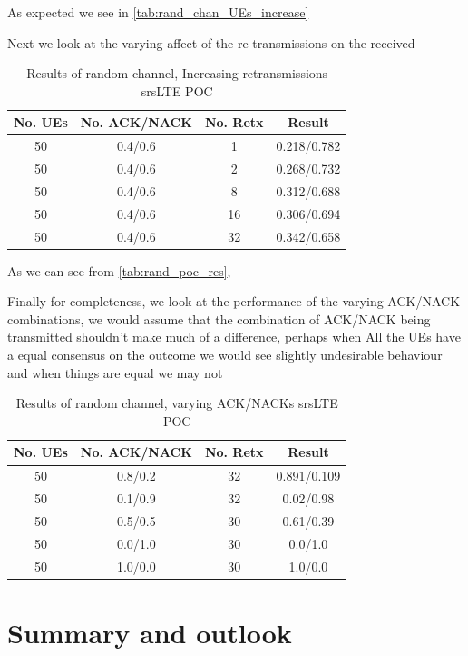 \documentclass{article}
\begin{document}
As expected we see in \cref{tab:rand_chan_UEs_increase}


Next we look at the varying affect of the re-transmissions on the received 

\begin{table}[H]
    \centering
 \begin{tabular}{||c c c c||} 
 \hline
 No. UEs & No. ACK/NACK & No. Retx & Result \\ [0.5ex] 
 \hline\hline
 50 &  0.4/0.6 & 1 &  0.218/0.782  \\ 
 \hline
 50 &  0.4/0.6 & 2 & 0.268/0.732 \\
 \hline
 50 &  0.4/0.6 & 8 & 0.312/0.688 \\
 \hline
 50 &  0.4/0.6 & 16 & 0.306/0.694 \\
 \hline
 50 &  0.4/0.6 & 32 & 0.342/0.658 \\ [1ex] 
 \hline
\end{tabular}
    \caption{Results of random channel, Increasing retransmissions srsLTE POC}
    \label{tab:rand_chan_rtx_increase}
\end{table}

As we can see from \cref{tab:rand_poc_res}, 

Finally for completeness, we look at the performance of the varying ACK/NACK combinations, we would assume that the combination of ACK/NACK being transmitted shouldn't make much of a difference, perhaps when All the UEs have a equal consensus on the outcome we would see slightly undesirable behaviour and when things are equal we may not 

\begin{table}[H]
    \centering
 \begin{tabular}{||c c c c||} 
 \hline
 No. UEs & No. ACK/NACK & No. Retx & Result \\ [0.5ex] 
 \hline\hline
 50 & 0.8/0.2 & 32 &  0.891/0.109 \\ 
 \hline
 50 & 0.1/0.9 & 32 & 0.02/0.98 \\
 \hline
 50 & 0.5/0.5 & 30 & 0.61/0.39 \\
 \hline
 \hline
 50 & 0.0/1.0 & 30 & 0.0/1.0 \\
 \hline
 50 & 1.0/0.0 & 30 & 1.0/0.0 \\ [1ex] 
 \hline
\end{tabular}
    \caption{Results of random channel, varying ACK/NACKs srsLTE POC}
    \label{tab:rand_chan_acks_change}
\end{table}

\section{Summary and outlook}\label{summary_out}
\end{document}
